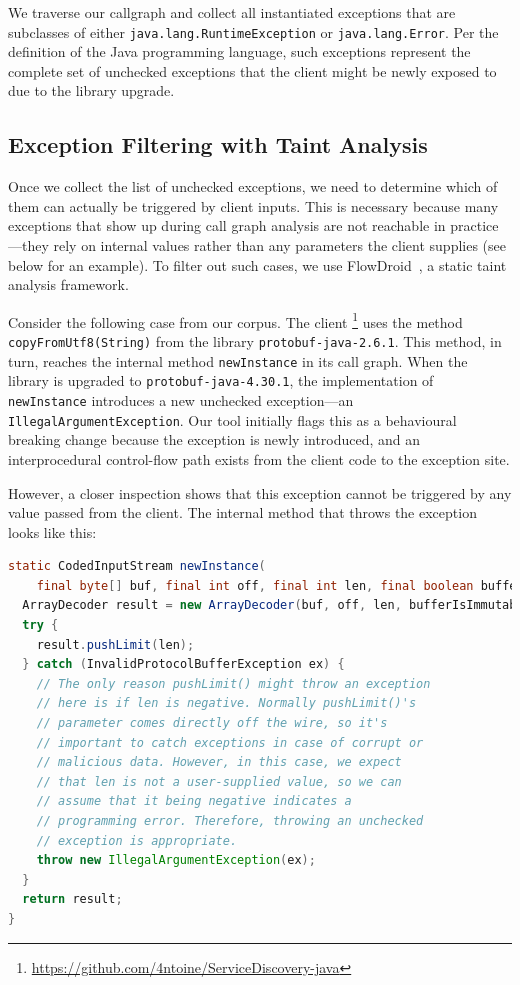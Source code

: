 We traverse our callgraph and collect all instantiated exceptions that are subclasses of either \texttt{java.lang.RuntimeException} or \texttt{java.lang.Error}. Per the definition of the Java programming language, such exceptions represent the complete set of unchecked exceptions that the client might be newly exposed to due to the library upgrade.

\subsection{Exception Filtering with Taint Analysis}

Once we collect the list of unchecked exceptions, we need to determine which of them can actually be triggered by client inputs. This is necessary because many exceptions that show up during call graph analysis are not reachable in practice---they rely on internal values rather than any parameters the client supplies (see below for an example). To filter out such cases, we use FlowDroid~\cite{Arzt14:_flowdroid}, a static taint analysis framework.

Consider the following case from our corpus. The client \texttt{}\footnote{\url{https://github.com/4ntoine/ServiceDiscovery-java}} uses the method \texttt{copyFromUtf8(String)} from the library \texttt{protobuf-java-2.6.1}. This method, in turn, reaches the internal method \texttt{newInstance} in its call graph. When the library is upgraded to \texttt{protobuf-java-4.30.1}, the implementation of \texttt{newInstance} introduces a new unchecked exception—an \texttt{IllegalArgumentException}. Our tool initially flags this as a behavioural breaking change because the exception is newly introduced, and an interprocedural control-flow path exists from the client code to the exception site.

However, a closer inspection shows that this exception cannot be triggered by any value passed from the client. The internal method that throws the exception looks like this:

\begin{lstlisting}[language=Java,breaklines=true,basicstyle=\scriptsize\ttfamily]
static CodedInputStream newInstance(
    final byte[] buf, final int off, final int len, final boolean bufferIsImmutable) {
  ArrayDecoder result = new ArrayDecoder(buf, off, len, bufferIsImmutable);
  try {
    result.pushLimit(len);
  } catch (InvalidProtocolBufferException ex) {
    // The only reason pushLimit() might throw an exception
    // here is if len is negative. Normally pushLimit()'s
    // parameter comes directly off the wire, so it's 
    // important to catch exceptions in case of corrupt or
    // malicious data. However, in this case, we expect 
    // that len is not a user-supplied value, so we can 
    // assume that it being negative indicates a 
    // programming error. Therefore, throwing an unchecked 
    // exception is appropriate.
    throw new IllegalArgumentException(ex);
  }
  return result;
}
\end{lstlisting}

